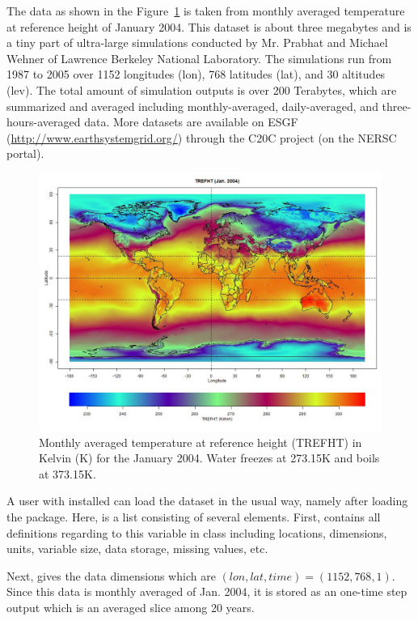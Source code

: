 The data  as shown in the Figure~\ref{fig:trefht}
is taken from monthly averaged temperature at reference height of January 2004.
This dataset is about three megabytes and is a tiny part of ultra-large 
simulations conducted by Mr. Prabhat and Michael Wehner of Lawrence Berkeley 
National Laboratory. The simulations run from 1987 to 2005 over 1152 longitudes 
(lon), 768 latitudes (lat), and 30 altitudes (lev). The total amount of 
simulation outputs is over 200 Terabytes, which are summarized and averaged 
including monthly-averaged, daily-averaged, and three-hours-averaged data.
More datasets are available on ESGF (\url{http://www.earthsystemgrid.org/})
through the C20C project (on the NERSC portal).
\begin{figure}[t]
  \centering
  \includegraphics[width=6.0in]{pbdDEMO-include/pics/trefht.jpg}
  \caption[Monthly averaged temperature]{Monthly averaged temperature at reference height (TREFHT) in
           Kelvin (K) for the January 2004. Water freezes at 273.15K and
           boils at 373.15K.}
  \label{fig:trefht}
\end{figure}

A user with  installed can load the  dataset in 
the usual way, namely  after loading the  
package.  Here,  is a list consisting of several elements. First, 
 contains all definitions regarding to this variable in
class  including locations, dimensions, 
units, variable size, data storage, missing values, etc. 

Next,  gives the data dimensions which are
$(lon, lat, time) = (1152, 768, 1)$. Since this data is monthly averaged
of Jan. 2004, it is stored as an one-time step output which is
an averaged slice among 20 years.

